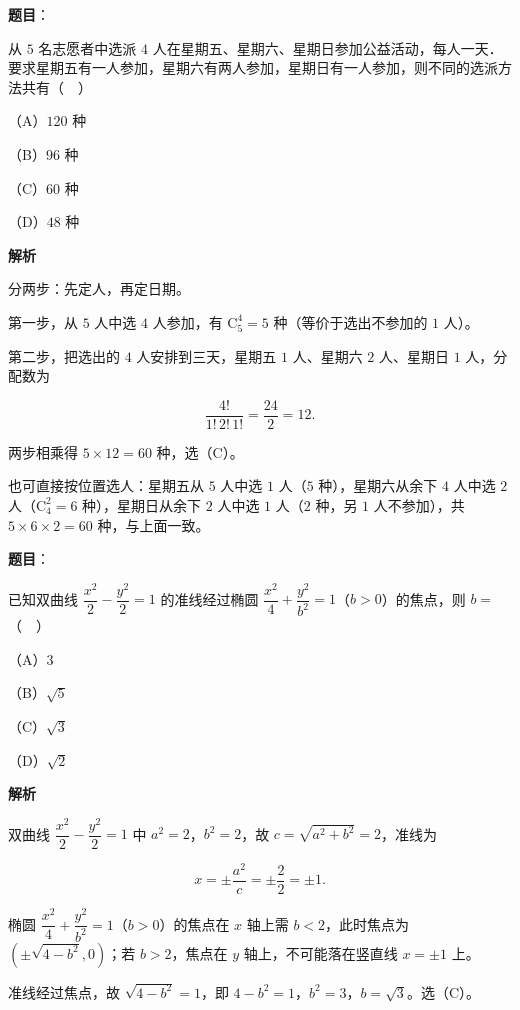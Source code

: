 \begin{answer}

\textbf{题目}：

从 $5$ 名志愿者中选派 $4$ 人在星期五、星期六、星期日参加公益活动，每人一天．要求星期五有一人参加，星期六有两人参加，星期日有一人参加，则不同的选派方法共有（　）

（A）$120$ 种

（B）$96$ 种

（C）$60$ 种

（D）$48$ 种

\textbf{解析}

分两步：先定人，再定日期。

第一步，从 $5$ 人中选 $4$ 人参加，有 $\mathrm C_5^4=5$ 种（等价于选出不参加的 $1$ 人）。

第二步，把选出的 $4$ 人安排到三天，星期五 $1$ 人、星期六 $2$ 人、星期日 $1$ 人，分配数为

\nopagebreak[4]
\[\frac{4!}{1!\,2!\,1!}=\frac{24}{2}=12.\]

两步相乘得 $5\times12=60$ 种，选（C）。

也可直接按位置选人：星期五从 $5$ 人中选 $1$ 人（$5$ 种），星期六从余下 $4$ 人中选 $2$ 人（$\mathrm C_4^2=6$ 种），星期日从余下 $2$ 人中选 $1$ 人（$2$ 种，另 $1$ 人不参加），共 $5\times6\times2=60$ 种，与上面一致。


\end{answer}
\begin{answer}

\textbf{题目}：

已知双曲线 $\dfrac{x^2}{2}-\dfrac{y^2}{2}=1$ 的准线经过椭圆 $\dfrac{x^2}{4}+\dfrac{y^2}{b^2}=1$（$b>0$）的焦点，则 $b=$（　）

（A）$3$

（B）$\sqrt5$

（C）$\sqrt3$

（D）$\sqrt2$

\textbf{解析}

双曲线 $\dfrac{x^2}{2}-\dfrac{y^2}{2}=1$ 中 $a^2=2$，$b^2=2$，故 $c=\sqrt{a^2+b^2}=2$，准线为

\nopagebreak[4]
\[x=\pm\frac{a^2}{c}=\pm\frac22=\pm1.\]

椭圆 $\dfrac{x^2}{4}+\dfrac{y^2}{b^2}=1$（$b>0$）的焦点在 $x$ 轴上需 $b<2$，此时焦点为 $(\pm\sqrt{4-b^2},0)$；若 $b>2$，焦点在 $y$ 轴上，不可能落在竖直线 $x=\pm1$ 上。

准线经过焦点，故 $\sqrt{4-b^2}=1$，即 $4-b^2=1$，$b^2=3$，$b=\sqrt3$。选（C）。


\end{answer}
